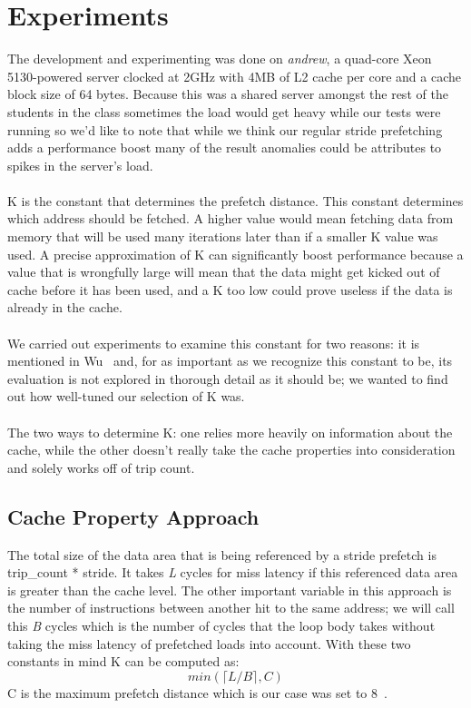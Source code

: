 \documentclass[11pt]{article}
\begin{document}
  \section{Experiments}
  The development and experimenting was done on \textit{andrew}, a quad-core Xeon 5130-powered server clocked at 2GHz with 4MB of L2 cache per core and a cache block size of 64 bytes. Because this was a shared server amongst the rest of the students in the class sometimes the load would get heavy while our tests were running so we’d like to note that while we think our regular stride prefetching adds a performance boost many of the result anomalies could be attributes to spikes in the server’s load. 
  \\\\K is the constant that determines the prefetch distance. This constant determines which address should be fetched. A higher value would mean fetching data from memory that will be used many iterations later than if a smaller K value was used. A precise approximation of K can significantly boost performance because a value that is wrongfully large will mean that the data might get kicked out of cache before it has been used, and a K too low could prove useless if the data is already in the cache.
  \\\\We carried out experiments to examine this constant for two reasons: it is mentioned in Wu~\cite{Wu200} and, for as important as we recognize this constant to be, its evaluation is not explored in thorough detail as it should be; we wanted to find out how well-tuned our selection of K was. 
  \\\\The two ways to determine K: one relies more heavily on information about the cache, while the other doesn’t really take the cache properties into consideration and solely works off of trip count. 
  \subsection{Cache Property Approach}
  \label{sec:cache_prop_approach}
  The total size of the data area that is being referenced by a stride prefetch is trip\_count * stride. It takes \textit{L} cycles for miss latency if this referenced data area is greater than the cache level. The other important variable in this approach is the number of instructions between another hit to the same address; we will call this \textit{B} cycles which is the number of cycles that the loop body takes without taking the miss latency of prefetched loads into account. With these
  two constants in mind K can be computed as:
  \begin{equation}
    min(\lceil L/B \rceil, C) 
    \label{eqn:cache_prop_approach}
  \end{equation}
  C is the maximum prefetch distance which is our case was set to 8~\cite{Wu2002}. 
\end{document}
